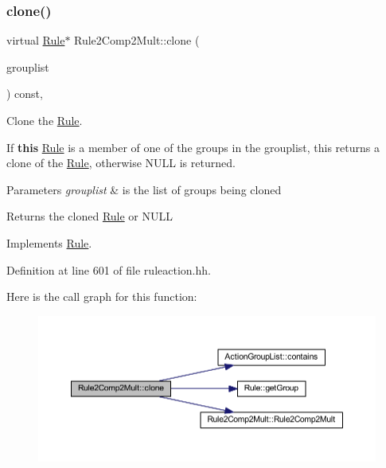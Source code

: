 \subsubsection{\texorpdfstring{clone()}{clone()}}
{\footnotesize\ttfamily virtual \mbox{\hyperlink{class_rule}{Rule}}$\ast$ Rule2\+Comp2\+Mult\+::clone (\begin{DoxyParamCaption}\item[{const \mbox{\hyperlink{class_action_group_list}{Action\+Group\+List}} \&}]{grouplist }\end{DoxyParamCaption}) const\hspace{0.3cm}{\ttfamily [inline]}, {\ttfamily [virtual]}}



Clone the \mbox{\hyperlink{class_rule}{Rule}}. 

If {\bfseries{this}} \mbox{\hyperlink{class_rule}{Rule}} is a member of one of the groups in the grouplist, this returns a clone of the \mbox{\hyperlink{class_rule}{Rule}}, otherwise N\+U\+LL is returned. 
\begin{DoxyParams}{Parameters}
{\em grouplist} & is the list of groups being cloned \\
\hline
\end{DoxyParams}
\begin{DoxyReturn}{Returns}
the cloned \mbox{\hyperlink{class_rule}{Rule}} or N\+U\+LL 
\end{DoxyReturn}


Implements \mbox{\hyperlink{class_rule_a70de90a76461bfa7ea0b575ce3c11e4d}{Rule}}.



Definition at line 601 of file ruleaction.\+hh.

Here is the call graph for this function\+:
\nopagebreak
\begin{figure}[H]
\begin{center}
\leavevmode
\includegraphics[width=350pt]{class_rule2_comp2_mult_a6aff1bc6cd4214605512eb99150f09d5_cgraph}
\end{center}
\end{figure}
\mbox{\label{class_rule2_comp2_mult_a5c3433a75e8030cd60735e167acba88d}} 
